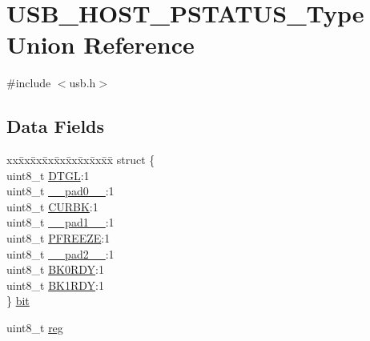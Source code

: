 \hypertarget{union_u_s_b___h_o_s_t___p_s_t_a_t_u_s___type}{}\section{U\+S\+B\+\_\+\+H\+O\+S\+T\+\_\+\+P\+S\+T\+A\+T\+U\+S\+\_\+\+Type Union Reference}
\label{union_u_s_b___h_o_s_t___p_s_t_a_t_u_s___type}


{\ttfamily \#include $<$usb.\+h$>$}

\subsection*{Data Fields}
\begin{DoxyCompactItemize}
\item 
\begin{tabbing}
xx\=xx\=xx\=xx\=xx\=xx\=xx\=xx\=xx\=\kill
struct \{\\
\>uint8\_t \mbox{\hyperlink{union_u_s_b___h_o_s_t___p_s_t_a_t_u_s___type_ae987ff8a18a3bbab4b726b8011064ea3}{DTGL}}:1\\
\>uint8\_t \mbox{\hyperlink{union_u_s_b___h_o_s_t___p_s_t_a_t_u_s___type_a8b4eebe79ded0459acec2f4950102ba3}{\_\_pad0\_\_}}:1\\
\>uint8\_t \mbox{\hyperlink{union_u_s_b___h_o_s_t___p_s_t_a_t_u_s___type_a60af70f2b5f295e7d0fad0cf6c31afb8}{CURBK}}:1\\
\>uint8\_t \mbox{\hyperlink{union_u_s_b___h_o_s_t___p_s_t_a_t_u_s___type_a77f12d2e278bd5c07712648ac0df5e08}{\_\_pad1\_\_}}:1\\
\>uint8\_t \mbox{\hyperlink{union_u_s_b___h_o_s_t___p_s_t_a_t_u_s___type_a5e5a7a11855be531dd9c6eddc438572e}{PFREEZE}}:1\\
\>uint8\_t \mbox{\hyperlink{union_u_s_b___h_o_s_t___p_s_t_a_t_u_s___type_a699d59ec18c35380ea34fd3ffd0fb839}{\_\_pad2\_\_}}:1\\
\>uint8\_t \mbox{\hyperlink{union_u_s_b___h_o_s_t___p_s_t_a_t_u_s___type_ae775e6182e0864ef4c8f1b31e8fc05df}{BK0RDY}}:1\\
\>uint8\_t \mbox{\hyperlink{union_u_s_b___h_o_s_t___p_s_t_a_t_u_s___type_a2bce60d1c409a249682ac9f0abd43e22}{BK1RDY}}:1\\
\} \mbox{\hyperlink{union_u_s_b___h_o_s_t___p_s_t_a_t_u_s___type_a7fc9b507af4130f3ea8fe671ef55e556}{bit}}\\

\end{tabbing}\item 
uint8\+\_\+t \mbox{\hyperlink{union_u_s_b___h_o_s_t___p_s_t_a_t_u_s___type_a9428adc9af4653a2050e2536b55dec8d}{reg}}
\end{DoxyCompactItemize}


